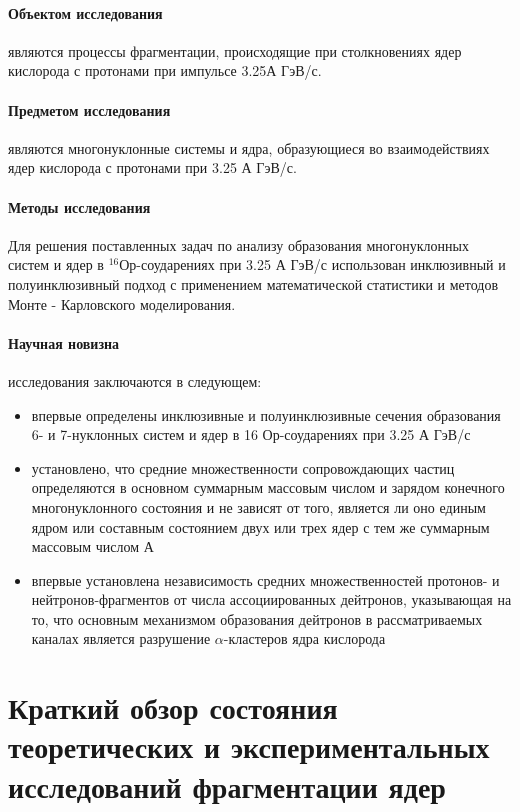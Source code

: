 \documentclass[fontsize=14pt]{scrarticle}
\begin{document}
\paragraph{Объектом исследования} являются процессы фрагментации, происходящие при столкновениях ядер кислорода с протонами при импульсе 3.25А ГэВ/с.
\paragraph{Предметом исследования}  являются многонуклонные системы и ядра, образующиеся во взаимодействиях ядер кислорода с протонами при 3.25 А ГэВ/с.
\paragraph{Методы исследования} Для решения поставленных задач по анализу образования многонуклонных систем и ядер в $^{16}$Ор-соударениях при 3.25 А ГэВ/с использован инклюзивный и полуинклюзивный подход с применением математической статистики и методов Монте - Карловского моделирования. 
\paragraph{Научная новизна} исследования заключаются в следующем:
\begin{itemize}
    \item впервые определены инклюзивные и полуинклюзивные сечения
образования 6- и 7-нуклонных систем и ядер в 16 Ор-соударениях при 3.25 А ГэВ/с
\item установлено, что средние множественности сопровождающих частиц
определяются в основном суммарным массовым числом и зарядом конечного
многонуклонного состояния и не зависят от того, является ли оно единым ядром или составным состоянием двух или трех ядер с тем же суммарным массовым числом А
\item впервые установлена независимость средних множественностей
протонов- и нейтронов-фрагментов от числа ассоциированных дейтронов,
указывающая на то, что основным механизмом образования дейтронов в
рассматриваемых каналах является разрушение $\alpha$-кластеров ядра кислорода
\end{itemize}

	
	
	
\section{Краткий обзор состояния теоретических и экспериментальных исследований фрагментации ядер}	
\end{document}
